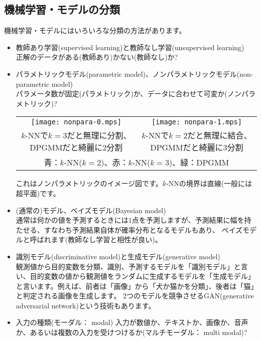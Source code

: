 \documentclass[a4j]{jarticle}
\begin{document}
\subsection{機械学習・モデルの分類}
機械学習・モデルにはいろいろな分類の方法があります。
\begin{itemize}
\item 教師あり学習(supervised learning)と教師なし学習(unsupervised learning) \\
正解のデータがある(教師あり)かない(教師なし)か?
\item パラメトリックモデル(parametric model)、ノンパラメトリックモデル(non-parametric model) \\
パラメータ数が固定(パラメトリック)か、データに合わせて可変か(ノンパラメトリック)?
\begin{tabular}{cc}
  \begin{minipage}[c]{0.45\linewidth}
    \texttt{[image: nonpara-0.mps]}
  \end{minipage}
  &
  \begin{minipage}[c]{0.45\linewidth}
    \texttt{[image: nonpara-1.mps]}
  \end{minipage} \\
  \scriptsize{$k$-NNで$k=3$だと無理に分割、DPGMMだと綺麗に$2$分割} &
  \scriptsize{$k$-NNで$k=2$だと無理に結合、DPGMMだと綺麗に$3$分割} \\
  \multicolumn{2}{c}{\scriptsize{青：$k$-NN($k=2$)、赤：$k$-NN($k=3$)、緑：DPGMM}}  
\end{tabular}
これはノンパラメトリックのイメージ図です。$k$-NNの境界は直線(一般には超平面)です。

\item (通常の)モデル、ベイズモデル(Bayesian model) \\
通常は何かの値を予測するときには$1$点を予測しますが、予測結果に幅を持たせる、すなわち予測結果自体が確率分布となるモデルもあり、
ベイズモデルと呼ばれます(教師なし学習と相性が良い)。
\item 識別モデル(discriminative model)と生成モデル(generative model) \\
観測値から目的変数を分類、識別、予測するモデルを「識別モデル」と言い、目的変数の値から観測値をランダムに生成するモデルを「生成モデル」
と言います。例えば、前者は「画像」から「犬か猫かを分類」、後者は「猫」と判定される画像を生成します。
2つのモデルを競争させるGAN(generative adversarial network)という技術もあります。
\item 入力の種類(モーダル： modal)
入力が数値か、テキストか、画像か、音声か、あるいは複数の入力を受けつけるか(マルチモーダル： multi modal)?
\end{itemize}
\end{document}
